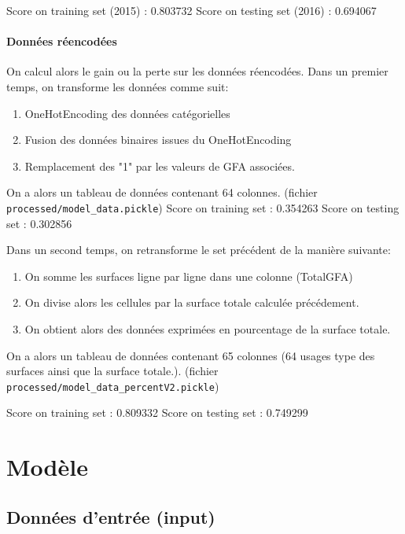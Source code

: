 \noindent Score on training set (2015) : 0.803732\newline
Score on testing set (2016) : 0.694067

\paragraph{Données réencodées}
On calcul alors le gain ou la perte sur les données réencodées.
Dans un premier temps, on transforme les données comme suit:
\begin{enumerate}
  \item OneHotEncoding des données catégorielles
  \item Fusion des données binaires issues du OneHotEncoding
  \item Remplacement des "1" par les valeurs de GFA associées.
\end{enumerate}
On a alors un tableau de données contenant 64 colonnes. (fichier \Verb+processed/model_data.pickle+)
\noindent Score on training set : 0.354263\newline
Score on testing set : 0.302856\newline


Dans un second temps, on retransforme le set précédent de la manière suivante:
\begin{enumerate}
  \item On somme les surfaces ligne par ligne dans une colonne (TotalGFA)
  \item On divise alors les cellules par la surface totale calculée précédement.
  \item On obtient alors des données exprimées en pourcentage de la surface totale.
\end{enumerate}
On a alors un  tableau de données contenant 65 colonnes (64 usages type des surfaces ainsi
que la surface totale.). (fichier \Verb+processed/model_data_percentV2.pickle+)

\noindent Score on training set : 0.809332\newline
Score on testing set : 0.749299


\section{Modèle}


\subsection{Données d'entrée (input)}

